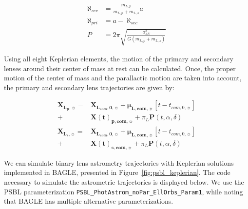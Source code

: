 \documentclass[twocolumn]{aastex701}
\newcommand{\vect}[1]{\boldsymbol{#1}}
\newcommand{\mulsysvec}{\vect{\mu}_{\boldsymbol{L, com},\sun}}
\newcommand{\Xlcomvec}{\vect{X}_{\boldsymbol{L_{com},0},\sun}}
\newcommand{\Xlpvec}{\vect{X}_{\boldsymbol{L_p},\sun}}
\newcommand{\Xlsvec}{\vect{X}_{\boldsymbol{L_s},\sun}}
\newcommand{\Xcomp}{\vect{X(t)}_{\boldsymbol{p},\boldsymbol{com},\sun}}
\newcommand{\Xcoms}{\vect{X(t)}_{\boldsymbol{s},\boldsymbol{com},\sun}}
\newcommand{\tcomnot}{t_{com,0,\sun}}
\newcommand{\w}{\omega_{pri}}
\newcommand{\bigomega}{\Omega_{sec}}
\newcommand{\inclination}{\textit{i}}
\newcommand{\period}{\textit{P}}
\newcommand{\al}{\aleph_{pri}}
\newcommand{\ala}{\aleph_{sec}}
\begin{document}
\begin{eqnarray*}
    \ala &= \frac{m_{L,p}}{m_{L,p}+m_{L,s}} a \nonumber \\
    \al &= a - \ala \nonumber \\
    \period &= 2 \pi \sqrt{\frac{a_{AU}^3}{G(m_{L,p} +m_{L,s})}}
\end{eqnarray*}

Using all eight Keplerian elements, the motion of the primary and secondary lenses around their center of mass at rest can be calculated. Once, the proper motion of the center of mass and the parallactic motion are taken into account, the primary and secondary lens trajectories are given by:

\begin{align}
    \Xlpvec =& \Xlcomvec + \mulsysvec [t - \tcomnot] \nonumber \\
    +& \Xcomp + \pi_L \vect{P}(t, \alpha, \delta) \\
    \Xlsvec =& \Xlcomvec + \mulsysvec [t - \tcomnot] \nonumber \\
    +& \Xcoms + \pi_L \vect{P}(t, \alpha, \delta) 
\end{align}

We can simulate binary lens astrometry trajectories with Keplerian solutions implemented in BAGLE, presented in Figure~\ref{fig:psbl_keplerian}. The code necessary to simulate the astrometric trajectories is displayed below. We use the PSBL parameterization \texttt{PSBL\_PhotAstrom\_noPar\_EllOrbs\_Param1}, while noting that BAGLE has multiple alternative parameterizations. 



\end{document}
